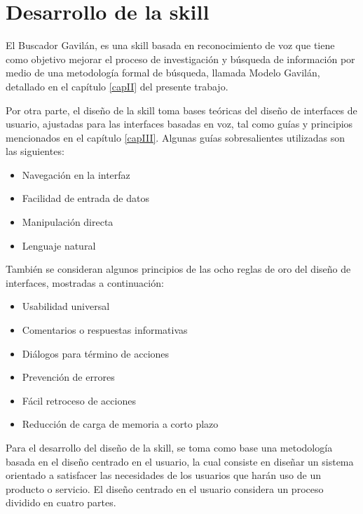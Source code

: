 
\chapter{Desarrollo de la skill}
\label{capIV}

El Buscador Gavilán, es una skill basada en reconocimiento de voz que tiene como objetivo mejorar el proceso de investigación y búsqueda de información por medio de una metodología formal de búsqueda, llamada Modelo Gavilán, detallado en el capítulo \ref{capII} del presente trabajo.

Por otra parte, el diseño de la skill toma bases teóricas del diseño de interfaces de usuario, ajustadas para las interfaces basadas en voz, tal como guías y principios mencionados en el capítulo \ref{capIII}. Algunas guías sobresalientes utilizadas son las siguientes:

\begin{itemize}
  \item Navegación en la interfaz
  \item Facilidad de entrada de datos
  \item Manipulación directa
  \item Lenguaje natural
\end{itemize}

También se consideran algunos principios de las ocho reglas de oro del diseño de interfaces, mostradas a continuación:

\begin{itemize}
  \item Usabilidad universal
  \item Comentarios o respuestas informativas
  \item Diálogos para término de acciones
  \item Prevención de errores
  \item Fácil retroceso de acciones
  \item Reducción de carga de memoria a corto plazo
\end{itemize}

Para el desarrollo del diseño de la skill, se toma como base una metodología basada en el diseño centrado en el usuario, la cual consiste en diseñar un sistema orientado a satisfacer las necesidades de los usuarios que harán uso de un producto o servicio. El diseño centrado en el usuario considera un proceso dividido en cuatro partes.


